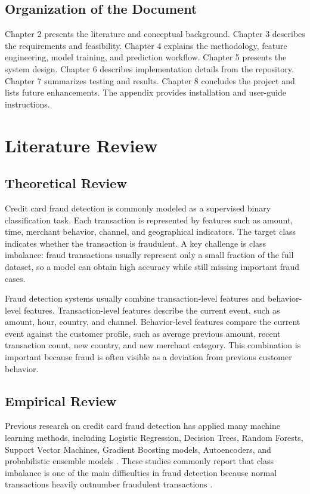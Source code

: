 \documentclass[12pt,a4paper]{report}
\begin{document}
\section{Organization of the Document}
Chapter 2 presents the literature and conceptual background. Chapter 3 describes the requirements and feasibility. Chapter 4 explains the methodology, feature engineering, model training, and prediction workflow. Chapter 5 presents the system design. Chapter 6 describes implementation details from the repository. Chapter 7 summarizes testing and results. Chapter 8 concludes the project and lists future enhancements. The appendix provides installation and user-guide instructions.

\chapter{Literature Review}

\section{Theoretical Review}
Credit card fraud detection is commonly modeled as a supervised binary classification task. Each transaction is represented by features such as amount, time, merchant behavior, channel, and geographical indicators. The target class indicates whether the transaction is fraudulent. A key challenge is class imbalance: fraud transactions usually represent only a small fraction of the full dataset, so a model can obtain high accuracy while still missing important fraud cases.

Fraud detection systems usually combine transaction-level features and behavior-level features. Transaction-level features describe the current event, such as amount, hour, country, and channel. Behavior-level features compare the current event against the customer profile, such as average previous amount, recent transaction count, new country, and new merchant category. This combination is important because fraud is often visible as a deviation from previous customer behavior.

\section{Empirical Review}
Previous research on credit card fraud detection has applied many machine learning methods, including Logistic Regression, Decision Trees, Random Forests, Support Vector Machines, Gradient Boosting models, Autoencoders, and probabilistic ensemble models \cite{he2022mlmethods,oza2019fraud,lin2021autoencoder}. These studies commonly report that class imbalance is one of the main difficulties in fraud detection because normal transactions heavily outnumber fraudulent transactions \cite{mallidi2021analysis,adesina2024creditcard}.
\end{document}
